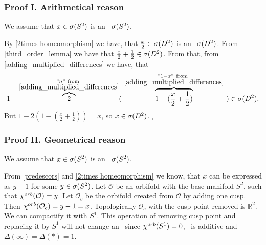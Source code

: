 \subsubsection{Proof I. Arithmetical reason}
We assume that $x \in {{\sigma}(S^2)}$ is an \apots\ ${{\sigma}(S^2)}$.

By \ref{2times homeomorphism} we have, that 
$\frac{x}{2} \in {{\sigma}(D^2)}$ is an \apots\ ${{\sigma}(D^2)}$. From \ref{third_order_lemma} we have that 
$\frac{x}{2} + \frac{1}{2} \in {{\sigma}(D^2)}$. From that, from \ref{adding_multiplied_differences} 
we have, 
that \begin{equation}
1-\overbrace{2}^{\substack{"n"\rm\ from\ \\ 
\rm \ref{adding_multiplied_differences}}} 
(\ \overbrace{1-(\frac{x}{2}+\frac{1}{2})}^{\substack{"1-x"\rm\ 
from\ \\ \rm \ref{adding_multiplied_differences}}}\ ) \in \speD.
\end{equation} 
But $1 - 2(1-(\frac{x}{2}+
\frac{1}{2})) = x$, so $x \in {{\sigma}(D^2)}$. $_\square$
\subsubsection{Proof II. Geometrical reason}
We assume that $x \in {{\sigma}(S^2)}$ is an \apots\ ${{\sigma}(S^2)}$.

From \ref{predescors} and \ref{2times homeomorphism} 
we know, that $x$ can be expressed as $y - 1$ for some $y \in {{\sigma}(S^2)}$.
Let $\mathcal{O}$ be an orbifold with the base manifold $S^2$, such that ${\chi^{orb}(\mathcal{O})} 
= y$. 
Let $\mathcal{O}_c$ be the orbifold created from $\mathcal{O}$ by adding one cusp. 
Then ${\chi^{orb}(\mathcal{O}_c)} = y - 1 = x$. Topologically $\mathcal{O}_c$ with the cusp point 
removed 
is $\mathbb{R}^2$. 
We can compactify it with $S^1$. This operation of removing cusp point and replacing it by $S^1$ 
will not change an \Eoc\ since ${\chi^{orb}(S^1)} = 0$, 
\Eoc\ is additive and $\Delta(\infty) = \Delta(\ast) = 1$.

